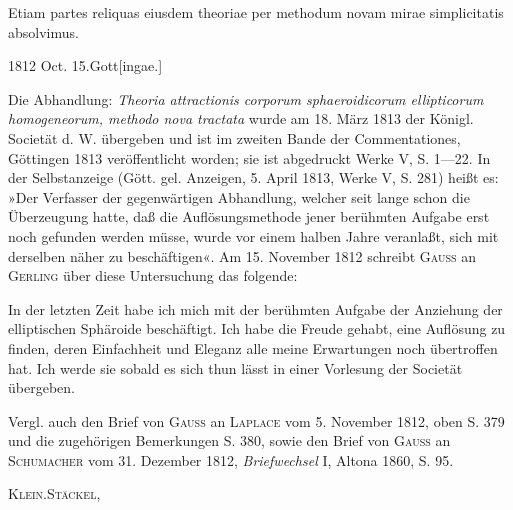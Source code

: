 \noindent\hspace*{\parindent}Etiam partes reliquas eiusdem theoriae per methodum novam mirae simplicitatis absolvimus.
\par\noindent\hfill 1812 Oct. 15.\quad Gott[ingae.]
\par\medskip\begingroup\small
\noindent\hspace*{\parindent}Die Abhandlung: \textit{Theoria attractionis corporum sphaeroidicorum ellipticorum homogeneorum, methodo nova tractata} wurde am 18. März 1813 der Königl. Societät d. W. übergeben und ist im zweiten Bande der Commentationes, Göttingen 1813 veröffentlicht worden; sie ist abgedruckt Werke V, S. 1—22. In der Selbstanzeige (Gött. gel. Anzeigen, 5. April 1813, Werke V, S. 281) heißt es: »Der Verfasser der gegenwärtigen Abhandlung, welcher seit lange schon die Überzeugung hatte, daß die  Auflösungsmethode jener berühmten Aufgabe erst noch gefunden werden müsse, wurde vor einem halben Jahre veranlaßt, sich mit derselben näher zu beschäftigen«. Am 15. November 1812 schreibt \textsc{Gauss} an \textsc{Gerling} über diese Untersuchung das folgende:
\par\endgroup
\noindent\hspace*{\parindent}In der letzten Zeit habe ich mich mit der berühmten Aufgabe der Anziehung der elliptischen Sphäroide beschäftigt. Ich habe die Freude gehabt, eine Auflösung zu finden, deren Einfachheit und Eleganz alle meine Erwartungen noch übertroffen hat. Ich werde sie sobald es sich thun lässt in einer Vorlesung der Societät übergeben.
\par\begingroup\small
\noindent\hspace*{\parindent}Vergl. auch den Brief von \textsc{Gauss} an \textsc{Laplace} vom 5. November 1812, oben S. 379 und die zugehörigen Bemerkungen S. 380, sowie den Brief von \textsc{Gauss} an \textsc{Schumacher} vom 31. Dezember 1812, \textit{Briefwechsel} I, Altona 1860, S. 95.
\par\noindent\hfill\textsc{Klein.\quad Stäckel,}
\par\endgroup
